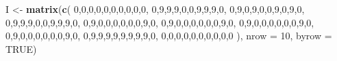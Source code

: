 \documentclass[
  portuguese,
  11pt,
  openany]{book}
\newenvironment{Shaded}{\begin{snugshade}}{\end{snugshade}}
\newcommand{\AttributeTok}[1]{\textcolor[rgb]{0.13,0.29,0.53}{#1}}
\newcommand{\ConstantTok}[1]{\textcolor[rgb]{0.56,0.35,0.01}{#1}}
\newcommand{\DecValTok}[1]{\textcolor[rgb]{0.00,0.00,0.81}{#1}}
\newcommand{\FunctionTok}[1]{\textcolor[rgb]{0.13,0.29,0.53}{\textbf{#1}}}
\newcommand{\NormalTok}[1]{#1}
\newcommand{\OtherTok}[1]{\textcolor[rgb]{0.56,0.35,0.01}{#1}}
\begin{document}
\begin{Shaded}
\begin{Highlighting}[]
\NormalTok{I }\OtherTok{\textless{}{-}} \FunctionTok{matrix}\NormalTok{(}\FunctionTok{c}\NormalTok{(}
  \DecValTok{0}\NormalTok{,}\DecValTok{0}\NormalTok{,}\DecValTok{0}\NormalTok{,}\DecValTok{0}\NormalTok{,}\DecValTok{0}\NormalTok{,}\DecValTok{0}\NormalTok{,}\DecValTok{0}\NormalTok{,}\DecValTok{0}\NormalTok{,}\DecValTok{0}\NormalTok{,}\DecValTok{0}\NormalTok{,}
  \DecValTok{0}\NormalTok{,}\DecValTok{9}\NormalTok{,}\DecValTok{9}\NormalTok{,}\DecValTok{9}\NormalTok{,}\DecValTok{0}\NormalTok{,}\DecValTok{0}\NormalTok{,}\DecValTok{9}\NormalTok{,}\DecValTok{9}\NormalTok{,}\DecValTok{9}\NormalTok{,}\DecValTok{0}\NormalTok{,}
  \DecValTok{0}\NormalTok{,}\DecValTok{9}\NormalTok{,}\DecValTok{0}\NormalTok{,}\DecValTok{9}\NormalTok{,}\DecValTok{0}\NormalTok{,}\DecValTok{0}\NormalTok{,}\DecValTok{9}\NormalTok{,}\DecValTok{0}\NormalTok{,}\DecValTok{9}\NormalTok{,}\DecValTok{0}\NormalTok{,}
  \DecValTok{0}\NormalTok{,}\DecValTok{9}\NormalTok{,}\DecValTok{9}\NormalTok{,}\DecValTok{9}\NormalTok{,}\DecValTok{0}\NormalTok{,}\DecValTok{0}\NormalTok{,}\DecValTok{9}\NormalTok{,}\DecValTok{9}\NormalTok{,}\DecValTok{9}\NormalTok{,}\DecValTok{0}\NormalTok{,}
  \DecValTok{0}\NormalTok{,}\DecValTok{9}\NormalTok{,}\DecValTok{0}\NormalTok{,}\DecValTok{0}\NormalTok{,}\DecValTok{0}\NormalTok{,}\DecValTok{0}\NormalTok{,}\DecValTok{0}\NormalTok{,}\DecValTok{0}\NormalTok{,}\DecValTok{9}\NormalTok{,}\DecValTok{0}\NormalTok{,}
  \DecValTok{0}\NormalTok{,}\DecValTok{9}\NormalTok{,}\DecValTok{0}\NormalTok{,}\DecValTok{0}\NormalTok{,}\DecValTok{0}\NormalTok{,}\DecValTok{0}\NormalTok{,}\DecValTok{0}\NormalTok{,}\DecValTok{0}\NormalTok{,}\DecValTok{9}\NormalTok{,}\DecValTok{0}\NormalTok{,}
  \DecValTok{0}\NormalTok{,}\DecValTok{9}\NormalTok{,}\DecValTok{0}\NormalTok{,}\DecValTok{0}\NormalTok{,}\DecValTok{0}\NormalTok{,}\DecValTok{0}\NormalTok{,}\DecValTok{0}\NormalTok{,}\DecValTok{0}\NormalTok{,}\DecValTok{9}\NormalTok{,}\DecValTok{0}\NormalTok{,}
  \DecValTok{0}\NormalTok{,}\DecValTok{9}\NormalTok{,}\DecValTok{0}\NormalTok{,}\DecValTok{0}\NormalTok{,}\DecValTok{0}\NormalTok{,}\DecValTok{0}\NormalTok{,}\DecValTok{0}\NormalTok{,}\DecValTok{0}\NormalTok{,}\DecValTok{9}\NormalTok{,}\DecValTok{0}\NormalTok{,}
  \DecValTok{0}\NormalTok{,}\DecValTok{9}\NormalTok{,}\DecValTok{9}\NormalTok{,}\DecValTok{9}\NormalTok{,}\DecValTok{9}\NormalTok{,}\DecValTok{9}\NormalTok{,}\DecValTok{9}\NormalTok{,}\DecValTok{9}\NormalTok{,}\DecValTok{9}\NormalTok{,}\DecValTok{0}\NormalTok{,}
  \DecValTok{0}\NormalTok{,}\DecValTok{0}\NormalTok{,}\DecValTok{0}\NormalTok{,}\DecValTok{0}\NormalTok{,}\DecValTok{0}\NormalTok{,}\DecValTok{0}\NormalTok{,}\DecValTok{0}\NormalTok{,}\DecValTok{0}\NormalTok{,}\DecValTok{0}\NormalTok{,}\DecValTok{0}
\NormalTok{), }\AttributeTok{nrow =} \DecValTok{10}\NormalTok{, }\AttributeTok{byrow =} \ConstantTok{TRUE}\NormalTok{)}
\end{Highlighting}
\end{Shaded}
\end{document}
